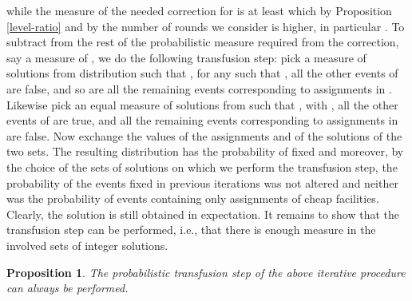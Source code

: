 \documentclass[11pt]{article}
\newtheorem{proposition}{Proposition}[section]
\newcommand{\qed}{\hfill \mbox{\raggedright \rule{2mm}{3mm}}}
\newenvironment{proof}{\noindent{\bf Proof.}}{\qed}
\begin{document}
while the measure of the  needed correction for  is at
 least   which by
 Proposition \ref{level-ratio} and by the number of rounds we consider
 is                higher,                in                particular
 . To
 subtract  from    the  rest  of  the  probabilistic
 measure required from  the correction, say a measure  of , we do
 the  following transfusion step:  pick a  measure   of solutions
 from distribution  such that ,  for any
  such that , all the other events of
  are false, and so are all the remaining events
 corresponding to  assignments in . Likewise pick  an equal measure
 of solutions  from   such that ,   with
 , all the other events of 
 are true,  and all the remaining events  corresponding to assignments
 in    are  false.  Now  exchange the  values  of  the  assignments
   and   of the  solutions of  the two  sets. The
 resulting distribution  has the probability  of  fixed
 and moreover,  by the  choice of  the sets of  solutions on  which we
 perform the transfusion step, the  probability of the events fixed in
 previous iterations  was not altered and neither  was the probability
 of events containing only assignments of cheap facilities.
Clearly, the solution  is still obtained in expectation. 
 It remains to show that the transfusion step can be performed, i.e., that
  there is enough  measure   in the  involved sets  of integer
 solutions.

\vspace*{-0.1cm}
\begin{proposition}\label{transf:prop}
The probabilistic transfusion step of the above iterative procedure can always be performed.
\end{proposition}
\vspace*{-0.5cm}
\begin{comment}
\begin{proof}
Consider the measure  in  of the set of integer solution satisfying   
and all events in  being false, namely . Then, by the random experiment of the construction of , this event is equivalent to the event that facility  is picked,  and  the  balls corresponding to the clients of the rest of events
are not tossed in their corresponding bins. Using again that both  are  and , we can bound the probability of the  balls  by that of  Bernoulli trials with probability of success  (we are once again very generous). Then the probability that all events on ball   fail is . Thus measure  is at least  which is constant. On the other hand the measure required by the transfusion step for each event  of iteration  that needs to be fixed is at most . There are  such events of iteration , and summing over all the iterations of our construction we get  which quantity is less than  for the  levels of SA we consider, so we can always pick the required amount of measure. 
\end{proof}
\end{comment}
\end{document}
